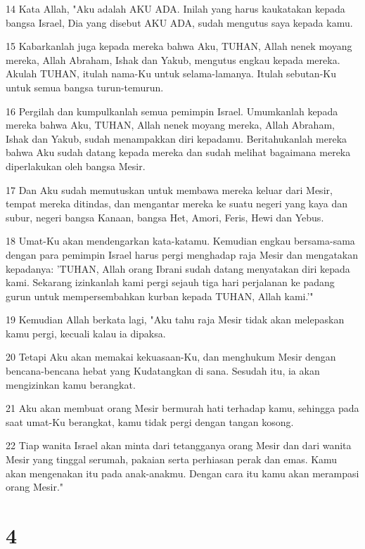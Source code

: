 \par 14 Kata Allah, "Aku adalah AKU ADA. Inilah yang harus kaukatakan kepada bangsa Israel, Dia yang disebut AKU ADA, sudah mengutus saya kepada kamu.
\par 15 Kabarkanlah juga kepada mereka bahwa Aku, TUHAN, Allah nenek moyang mereka, Allah Abraham, Ishak dan Yakub, mengutus engkau kepada mereka. Akulah TUHAN, itulah nama-Ku untuk selama-lamanya. Itulah sebutan-Ku untuk semua bangsa turun-temurun.
\par 16 Pergilah dan kumpulkanlah semua pemimpin Israel. Umumkanlah kepada mereka bahwa Aku, TUHAN, Allah nenek moyang mereka, Allah Abraham, Ishak dan Yakub, sudah menampakkan diri kepadamu. Beritahukanlah mereka bahwa Aku sudah datang kepada mereka dan sudah melihat bagaimana mereka diperlakukan oleh bangsa Mesir.
\par 17 Dan Aku sudah memutuskan untuk membawa mereka keluar dari Mesir, tempat mereka ditindas, dan mengantar mereka ke suatu negeri yang kaya dan subur, negeri bangsa Kanaan, bangsa Het, Amori, Feris, Hewi dan Yebus.
\par 18 Umat-Ku akan mendengarkan kata-katamu. Kemudian engkau bersama-sama dengan para pemimpin Israel harus pergi menghadap raja Mesir dan mengatakan kepadanya: 'TUHAN, Allah orang Ibrani sudah datang menyatakan diri kepada kami. Sekarang izinkanlah kami pergi sejauh tiga hari perjalanan ke padang gurun untuk mempersembahkan kurban kepada TUHAN, Allah kami.'"
\par 19 Kemudian Allah berkata lagi, "Aku tahu raja Mesir tidak akan melepaskan kamu pergi, kecuali kalau ia dipaksa.
\par 20 Tetapi Aku akan memakai kekuasaan-Ku, dan menghukum Mesir dengan bencana-bencana hebat yang Kudatangkan di sana. Sesudah itu, ia akan mengizinkan kamu berangkat.
\par 21 Aku akan membuat orang Mesir bermurah hati terhadap kamu, sehingga pada saat umat-Ku berangkat, kamu tidak pergi dengan tangan kosong.
\par 22 Tiap wanita Israel akan minta dari tetangganya orang Mesir dan dari wanita Mesir yang tinggal serumah, pakaian serta perhiasan perak dan emas. Kamu akan mengenakan itu pada anak-anakmu. Dengan cara itu kamu akan merampasi orang Mesir."

\chapter{4}

